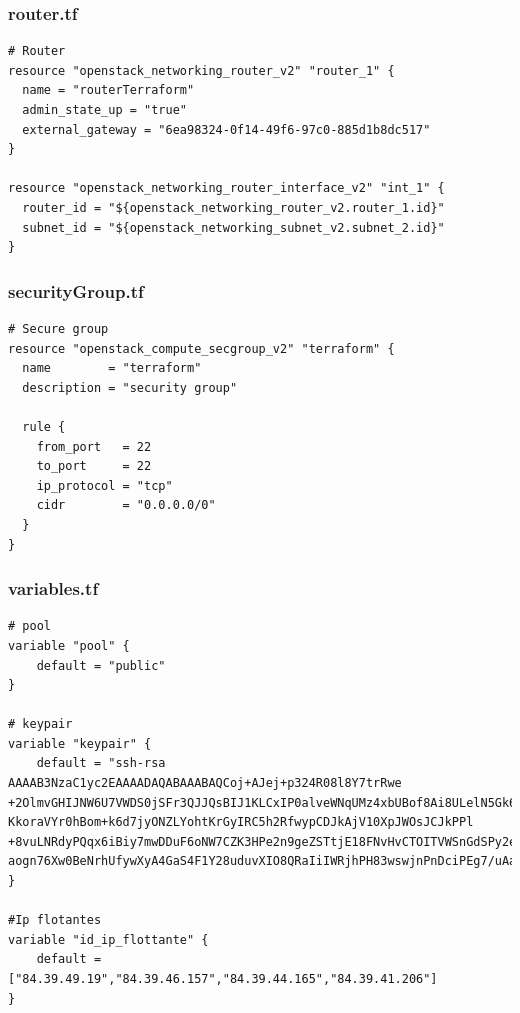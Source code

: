\documentclass[]{article}
\begin{document}
\subsubsection*{router.tf}
\begin{verbatim}
# Router
resource "openstack_networking_router_v2" "router_1" {
  name = "routerTerraform"
  admin_state_up = "true"
  external_gateway = "6ea98324-0f14-49f6-97c0-885d1b8dc517"
}

resource "openstack_networking_router_interface_v2" "int_1" {
  router_id = "${openstack_networking_router_v2.router_1.id}"
  subnet_id = "${openstack_networking_subnet_v2.subnet_2.id}"
}
\end{verbatim}

\subsubsection*{securityGroup.tf}
\begin{verbatim}
# Secure group
resource "openstack_compute_secgroup_v2" "terraform" {
  name        = "terraform"
  description = "security group"
  
  rule {
    from_port   = 22
    to_port     = 22
    ip_protocol = "tcp"
    cidr        = "0.0.0.0/0"
  }
}
\end{verbatim}

\subsubsection*{variables.tf}
\begin{verbatim}
# pool
variable "pool" {
    default = "public"
}

# keypair
variable "keypair" {
    default = "ssh-rsa AAAAB3NzaC1yc2EAAAADAQABAAABAQCoj+AJej+p324R08l8Y7trRwe
+2OlmvGHIJNW6U7VWDS0jSFr3QJJQsBIJ1KLCxIP0alveWNqUMz4xbUBof8Ai8ULelN5Gk64EsRmkH2Bncxs
KkoraVYr0hBom+k6d7jyONZLYohtKrGyIRC5h2RfwypCDJkAjV10XpJWOsJCJkPPl
+8vuLNRdyPQqx6iBiy7mwDDuF6oNW7CZK3HPe2n9geZSTtjE18FNvHvCTOITVWSnGdSPy2e89ahemM0B3ROo
aogn76Xw0BeNrhUfywXyA4GaS4F1Y28uduvXIO8QRaIiIWRjhPH83wswjnPnDciPEg7/uAa/yZSy1SXFU5V"
}

#Ip flotantes
variable "id_ip_flottante" { 
    default = ["84.39.49.19","84.39.46.157","84.39.44.165","84.39.41.206"]
} 
\end{verbatim}
\end{document}
